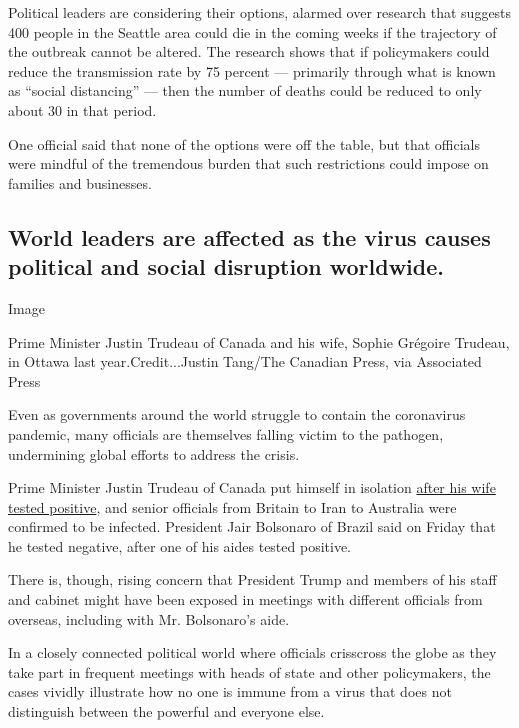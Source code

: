 Political leaders are considering their options, alarmed over research
that suggests 400 people in the Seattle area could die in the coming
weeks if the trajectory of the outbreak cannot be altered. The research
shows that if policymakers could reduce the transmission rate by 75
percent --- primarily through what is known as ``social distancing'' ---
then the number of deaths could be reduced to only about 30 in that
period.

One official said that none of the options were off the table, but that
officials were mindful of the tremendous burden that such restrictions
could impose on families and businesses.

\hypertarget{world-leaders-are-affected-as-the-virus-causes-political-and-social-disruption-worldwide}{%
\subsection{World leaders are affected as the virus causes political and
social disruption
worldwide.}\label{world-leaders-are-affected-as-the-virus-causes-political-and-social-disruption-worldwide}}

Image

Prime Minister Justin Trudeau of Canada and his wife, Sophie Grégoire
Trudeau, in Ottawa last year.Credit...Justin Tang/The Canadian Press,
via Associated Press

Even as governments around the world struggle to contain the coronavirus
pandemic, many officials are themselves falling victim to the pathogen,
undermining global efforts to address the crisis.

Prime Minister Justin Trudeau of Canada put himself in isolation
\href{https://www.nytimes3xbfgragh.onion/2020/03/12/world/canada/trudeau-wife-coronavirus.html}{after
his wife tested positive}, and senior officials from Britain to Iran to
Australia were confirmed to be infected. President Jair Bolsonaro of
Brazil said on Friday that he tested negative, after one of his aides
tested positive.

There is, though, rising concern that President Trump and members of his
staff and cabinet might have been exposed in meetings with different
officials from overseas, including with Mr. Bolsonaro's aide.

In a closely connected political world where officials crisscross the
globe as they take part in frequent meetings with heads of state and
other policymakers, the cases vividly illustrate how no one is immune
from a virus that does not distinguish between the powerful and everyone
else.

